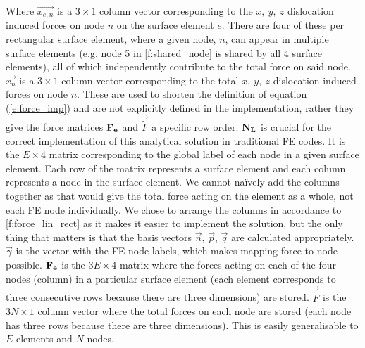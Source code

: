 \documentclass[11pt]{iopart}
\begin{document}
Where $\vec{x_{e,n}}$ is a $3\times1$ column vector corresponding to the $x,~y,~z$ dislocation induced forces on node $n$ on the surface element $e$. There are four of these per rectangular surface element, where a given node, $n$, can appear in multiple surface elements (e.g. node 5 in \cref{f:shared_node} is shared by all 4 surface elements), all of which independently contribute to the total force on said node. $\vec{x_n}$ is a $3\times1$ column vector corresponding to the total $x,~y,~z$ dislocation induced forces on node $n$. These are used to shorten the definition of equation (\ref{e:force_imp}) and are not explicitly defined in the implementation, rather they give the force matrices $\mathbf{F_{e}}$ and $\vec{\tilde{F}}$ a specific row order. $\mathbf{N_{L}}$ is crucial for the correct implementation of this analytical solution in traditional FE codes. It is the $E\times4$ matrix corresponding to the global label of each node in a given surface element. Each row of the matrix represents a surface element and each column represents a node in the surface element. We cannot na\"ively add the columns together as that would give the total force acting on the element as a whole, not each FE node individually. We chose to arrange the columns in accordance to \cref{f:force_lin_rect} as it makes it easier to implement the solution, but the only thing that matters is that the basis vectors $\vec{n},\,\vec{p},\,\vec{q}$ are calculated appropriately. $\vec{\gamma}$ is the vector with the FE node labels, which makes mapping force to node possible. $\mathbf{F_{e}}$ is the $3E \times 4$ matrix where the forces acting on each of the four nodes (column) in a particular surface element (each element corresponds to three consecutive rows because there are three dimensions) are stored. $\vec{\tilde{F}}$ is the $3N\times1$ column vector where the total forces on each node are stored (each node has three rows because there are three dimensions). This is easily generalisable to $E$ elements and $N$ nodes.
\end{document}
